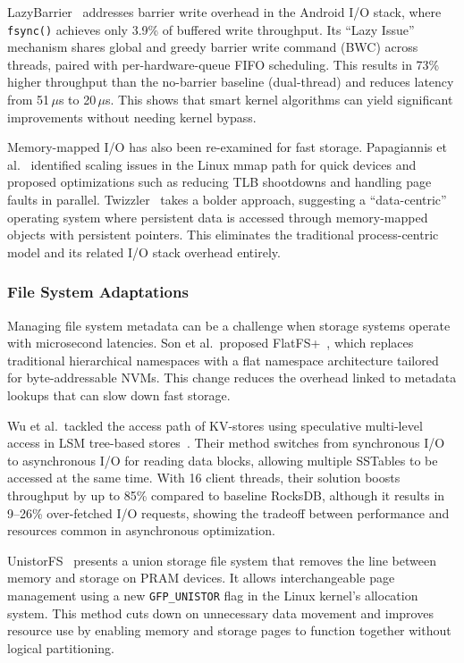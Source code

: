 \documentclass[conference]{IEEEtran}
\begin{document}
LazyBarrier~\cite{lazybarrier2024} addresses barrier write overhead in the Android I/O stack, where \texttt{fsync()} achieves only 3.9\% of buffered write throughput. Its ``Lazy Issue'' mechanism shares global and greedy barrier write command (BWC) across threads, paired with per-hardware-queue FIFO scheduling. This results in 73\% higher throughput than the no-barrier baseline (dual-thread) and reduces latency from 51\,$\mu$s to 20\,$\mu$s. This shows that smart kernel algorithms can yield significant improvements without needing kernel bypass.

Memory-mapped I/O has also been re-examined for fast storage. Papagiannis et al.~\cite{papagiannis2020mmap} identified scaling issues in the Linux mmap path for quick devices and proposed optimizations such as reducing TLB shootdowns and handling page faults in parallel. Twizzler~\cite{peter2021twizzler} takes a bolder approach, suggesting a ``data-centric'' operating system where persistent data is accessed through memory-mapped objects with persistent pointers. This eliminates the traditional process-centric model and its related I/O stack overhead entirely.

\subsubsection{File System Adaptations}
\label{sec:fs}

Managing file system metadata can be a challenge when storage systems operate with microsecond latencies. Son et al.\ proposed FlatFS+~\cite{son2024flatns}, which replaces traditional hierarchical namespaces with a flat namespace architecture tailored for byte-addressable NVMs. This change reduces the overhead linked to metadata lookups that can slow down fast storage.

Wu et al.\ tackled the access path of KV-stores using speculative multi-level access in LSM tree-based stores~\cite{park2022speculative}. Their method switches from synchronous I/O to asynchronous I/O for reading data blocks, allowing multiple SSTables to be accessed at the same time. With 16 client threads, their solution boosts throughput by up to 85\% compared to baseline RocksDB, although it results in 9--26\% over-fetched I/O requests, showing the tradeoff between performance and resources common in asynchronous optimization.

UnistorFS~\cite{wu2020unistorfs} presents a union storage file system that removes the line between memory and storage on PRAM devices. It allows interchangeable page management using a new \texttt{GFP\_UNISTOR} flag in the Linux kernel's allocation system. This method cuts down on unnecessary data movement and improves resource use by enabling memory and storage pages to function together without logical partitioning.
\end{document}
